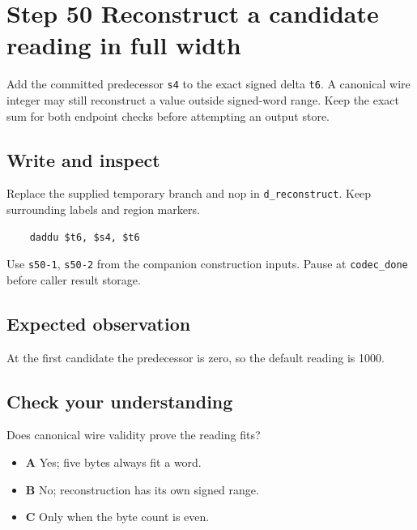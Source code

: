 \section{Step 50 Reconstruct a candidate reading in full width}\label{delta-s50}

Add the committed predecessor \texttt{s4} to the exact signed delta \texttt{t6}. A canonical wire integer may still reconstruct a value outside signed-word range. Keep the exact sum for both endpoint checks before attempting an output store.

\subsection{Write and inspect}
Replace the supplied temporary branch and nop in \texttt{d\_reconstruct}. Keep surrounding labels and region markers.

\begin{verbatim}
    daddu $t6, $s4, $t6
\end{verbatim}
Use \texttt{s50-1}, \texttt{s50-2} from the companion construction inputs. Pause at \texttt{codec\_done} before caller result storage.

\subsection{Expected observation}
At the first candidate the predecessor is zero, so the default reading is 1000.

\subsection{Check your understanding}
Does canonical wire validity prove the reading fits?

\begin{itemize}
\item \textbf{A} Yes; five bytes always fit a word.
\item \textbf{B} No; reconstruction has its own signed range.
\item \textbf{C} Only when the byte count is even.
\end{itemize}

